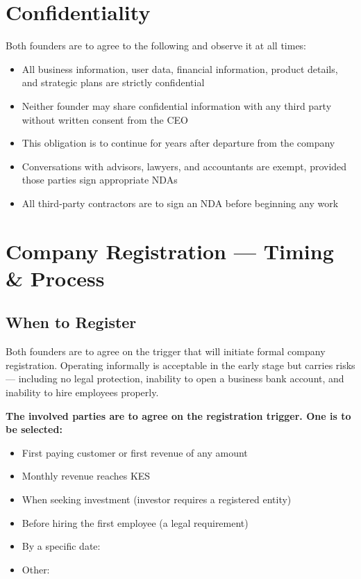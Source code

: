 \documentclass[12pt,a4paper]{article}
\newcommand{\blank}[1][5.5cm]{\underline{\hspace{#1}}}
\newcommand{\cb}{$\square$\;}                   %
\begin{document}
\section{Confidentiality}

Both founders are to agree to the following and observe it at all times:

\begin{itemize}
  \item All business information, user data, financial information, product details, and strategic plans are strictly confidential
  \item Neither founder may share confidential information with any third party without written consent from the CEO
  \item This obligation is to continue for \blank[2cm] years after departure from the company
  \item Conversations with advisors, lawyers, and accountants are exempt, provided those parties sign appropriate NDAs
  \item All third-party contractors are to sign an NDA before beginning any work
\end{itemize}

\section{Company Registration --- Timing \& Process}

\subsection{When to Register}

Both founders are to agree on the trigger that will initiate formal company registration. Operating informally is acceptable in the early stage but carries risks --- including no legal protection, inability to open a business bank account, and inability to hire employees properly.

\noindent\textbf{The involved parties are to agree on the registration trigger. One is to be selected:}

\begin{itemize}[label=\cb]
  \item First paying customer or first revenue of any amount
  \item Monthly revenue reaches KES \blank[3.5cm]
  \item When seeking investment (investor requires a registered entity)
  \item Before hiring the first employee (a legal requirement)
  \item By a specific date: \blank[4cm]
  \item Other: \blank[5cm]
\end{itemize}
\end{document}
